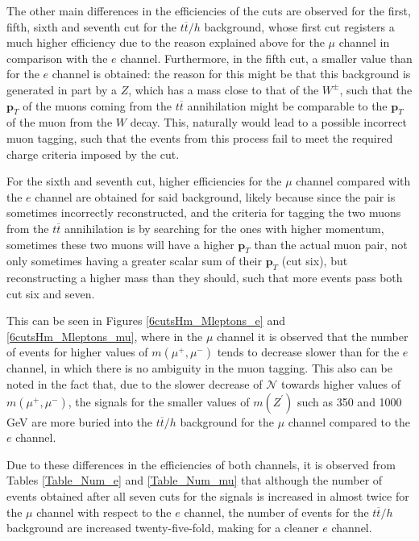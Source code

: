 The other main differences in the efficiencies of the cuts are observed for the first, fifth, sixth and seventh cut for the $t\overline t/h$ background, whose first cut registers a much higher efficiency due to the reason explained above for the $\mu$ channel in comparison with the $e$ channel. Furthermore, in the fifth cut, a smaller value than for the $e$ channel is obtained: the reason for this might be that this background is generated in part by a $Z$, which has a mass close to that of the $W^{\pm}$, such that the $\bm{p}_T$ of the muons coming from the $t\overline t$ annihilation might be comparable to the $\bm{p}_T$ of the muon from the $W$ decay. This, naturally would lead to a possible incorrect muon tagging, such that the events from this process fail to meet the required charge criteria imposed by the cut. 

For the sixth and seventh cut, higher efficiencies for the $\mu$ channel compared with the $e$ channel are obtained for said background, likely because since the pair is sometimes incorrectly reconstructed, and the criteria for tagging the two muons from the $t\overline t$ annihilation is by searching for the ones with higher momentum, sometimes these two muons will have a higher $\bm{p}_T$ than the actual muon pair, not only sometimes having a greater scalar sum of their $\bm{p}_T$ (cut six), but reconstructing a higher mass than they should, such that more events pass both cut six and seven. 

This can be seen in Figures \ref{6cutsHm_Mleptons_e} and \ref{6cutsHm_Mleptons_mu}, where in the $\mu$ channel it is observed that the number of events for higher values of $m(\mu^+, \mu^-)$ tends to decrease slower than for the $e$ channel, in which there is no ambiguity in the muon tagging. This also can be noted in the fact that, due to the slower decrease of $\mathcal{N}$ towards higher values of $m(\mu^+, \mu^-)$, the signals for the smaller values of $m(Z^{\prime})$ such as 350 and 1000 GeV are more buried into the $t\overline t/h$ background for the $\mu$ channel compared to the $e$ channel.

Due to these differences in the efficiencies of both channels, it is observed from Tables \ref{Table_Num_e} and \ref{Table_Num_mu} that although the number of events obtained after all seven cuts for the signals is increased in almost twice for the $\mu$ channel with respect to the $e$ channel, the number of events for the $t\overline t/h$ background are increased twenty-five-fold, making for a cleaner $e$ channel.

